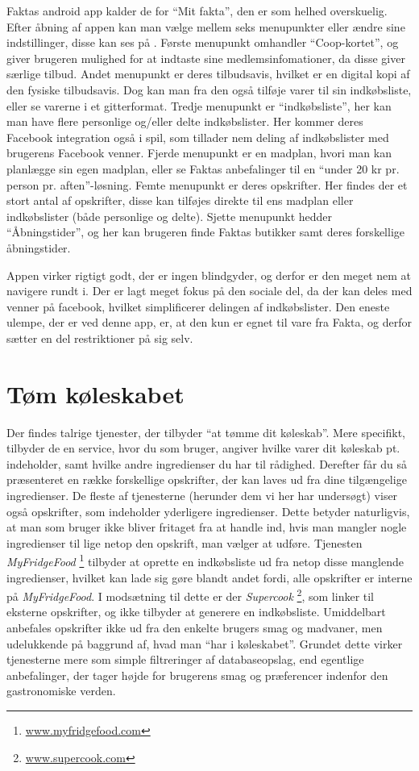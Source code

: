 Faktas android app kalder de for ``Mit fakta'', den er som helhed overskuelig.
Efter åbning af appen kan man vælge mellem seks menupunkter eller ændre sine indstillinger, disse kan ses på .
Første menupunkt omhandler ``Coop-kortet'', og giver brugeren mulighed for at indtaste sine medlemsinfomationer, da disse giver særlige tilbud.
Andet menupunkt er deres tilbudsavis, hvilket er en digital kopi af den fysiske tilbudsavis. 
Dog kan man fra den også tilføje varer til sin indkøbsliste, eller se varerne i et gitterformat.
Tredje menupunkt er ``indkøbsliste'', her kan man have flere personlige og/eller delte indkøbslister.
Her kommer deres Facebook integration også i spil, som tillader nem deling af indkøbslister med brugerens Facebook venner.
Fjerde menupunkt er en madplan, hvori man kan planlægge sin egen madplan, eller se Faktas anbefalinger til en ``under 20 kr pr. person pr. aften''-løsning.
Femte menupunkt er deres opskrifter.
Her findes der et stort antal af opskrifter, disse kan tilføjes direkte til ens madplan eller indkøbslister (både personlige og delte).
Sjette menupunkt hedder ``Åbningstider'', og her kan brugeren finde Faktas butikker samt deres forskellige åbningstider. 

Appen virker rigtigt godt, der er ingen blindgyder, og derfor er den meget nem at navigere rundt i. Der er lagt meget fokus på den sociale del, da der kan deles med venner på facebook, hvilket simplificerer delingen af indkøbslister. Den eneste ulempe, der er ved denne app, er, at den kun er egnet til vare fra Fakta, og derfor sætter en del restriktioner på sig selv.

\section{Tøm køleskabet}
Der findes talrige tjenester, der tilbyder ``at tømme dit køleskab''. 
Mere specifikt, tilbyder de en service, hvor du som bruger, angiver hvilke varer dit køleskab pt. indeholder, samt hvilke andre ingredienser du har til rådighed. 
Derefter får du så præsenteret en række forskellige opskrifter, der kan laves ud fra dine tilgængelige ingredienser. 
De fleste af tjenesterne (herunder dem vi her har undersøgt) viser også opskrifter, som indeholder yderligere ingredienser. 
Dette betyder naturligvis, at man som bruger ikke bliver fritaget fra at handle ind, hvis man mangler nogle ingredienser til lige netop den opskrift, man vælger at udføre. 
Tjenesten \textit{MyFridgeFood} \footnote{\underline{www.myfridgefood.com}} tilbyder at oprette en indkøbsliste ud fra netop disse manglende ingredienser, hvilket kan lade sig gøre blandt andet fordi, alle opskrifter er interne på \textit{MyFridgeFood}. 
I modsætning til dette er der \textit{Supercook} \footnote{\underline{www.supercook.com}}, som linker til eksterne opskrifter, og ikke tilbyder at generere en indkøbsliste. 
Umiddelbart anbefales opskrifter ikke ud fra den enkelte brugers smag og madvaner, men udelukkende på baggrund af, hvad man ``har i køleskabet''. 
Grundet dette virker tjenesterne mere som simple filtreringer af databaseopslag, end egentlige anbefalinger, der tager højde for brugerens smag og præferencer indenfor den gastronomiske verden.

